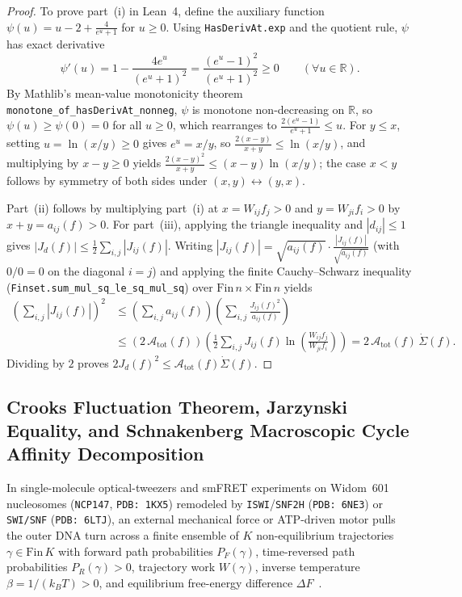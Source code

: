 \documentclass[11pt,a4paper]{article}
\theoremstyle{definition}
\begin{document}
\begin{proof}
To prove part~(i) in Lean~4, define the auxiliary function $\psi(u) = u - 2 + \frac{4}{e^u + 1}$ for $u \ge 0$. Using \texttt{HasDerivAt.exp} and the quotient rule, $\psi$ has exact derivative
\[
  \psi'(u) = 1 - \frac{4 e^u}{(e^u + 1)^2} = \frac{(e^u - 1)^2}{(e^u + 1)^2} \ge 0 \qquad (\forall u \in \mathbb{R}).
\]
By Mathlib's mean-value monotonicity theorem \texttt{monotone\_of\_hasDerivAt\_nonneg}, $\psi$ is monotone non-decreasing on $\mathbb{R}$, so $\psi(u) \ge \psi(0) = 0$ for all $u \ge 0$, which rearranges to $\frac{2(e^u - 1)}{e^u + 1} \le u$. For $y \le x$, setting $u = \ln(x/y) \ge 0$ gives $e^u = x/y$, so $\frac{2(x - y)}{x + y} \le \ln(x/y)$, and multiplying by $x - y \ge 0$ yields $\frac{2(x-y)^2}{x+y} \le (x-y)\ln(x/y)$; the case $x < y$ follows by symmetry of both sides under $(x,y) \leftrightarrow (y,x)$.

Part~(ii) follows by multiplying part~(i) at $x = W_{ij}f_j > 0$ and $y = W_{ji}f_i > 0$ by $x + y = a_{ij}(f) > 0$. For part~(iii), applying the triangle inequality and $|d_{ij}| \le 1$ gives $|J_d(f)| \le \frac{1}{2}\sum_{i,j} |J_{ij}(f)|$. Writing $|J_{ij}(f)| = \sqrt{a_{ij}(f)} \cdot \frac{|J_{ij}(f)|}{\sqrt{a_{ij}(f)}}$ (with $0/0 = 0$ on the diagonal $i = j$) and applying the finite Cauchy--Schwarz inequality (\texttt{Finset.sum\_mul\_sq\_le\_sq\_mul\_sq}) over $\mathrm{Fin}\,n \times \mathrm{Fin}\,n$ yields
\[
\begin{aligned}
  \left(\sum_{i,j} |J_{ij}(f)|\right)^2
  &\le \left(\sum_{i,j} a_{ij}(f)\right)\left(\sum_{i,j} \frac{J_{ij}(f)^2}{a_{ij}(f)}\right) \\
  &\le \left(2\,\mathcal{A}_{\mathrm{tot}}(f)\right)\left(\frac{1}{2}\sum_{i,j} J_{ij}(f)\ln\!\left(\frac{W_{ij}f_j}{W_{ji}f_i}\right)\right) = 2\,\mathcal{A}_{\mathrm{tot}}(f)\,\dot{\Sigma}(f).
\end{aligned}
\]
Dividing by $2$ proves $2 J_d(f)^2 \le \mathcal{A}_{\mathrm{tot}}(f)\dot{\Sigma}(f)$.
\end{proof}

\subsection{Crooks Fluctuation Theorem, Jarzynski Equality, and Schnakenberg Macroscopic Cycle Affinity Decomposition}

In single-molecule optical-tweezers and smFRET experiments on Widom~601 nucleosomes (\texttt{NCP147}, \texttt{PDB: 1KX5}) remodeled by \texttt{ISWI}/\texttt{SNF2H} (\texttt{PDB: 6NE3}) or \texttt{SWI/SNF} (\texttt{PDB: 6LTJ}), an external mechanical force or ATP-driven motor pulls the outer DNA turn across a finite ensemble of $K$ non-equilibrium trajectories $\gamma \in \mathrm{Fin}\,K$ with forward path probabilities $P_F(\gamma)$, time-reversed path probabilities $P_R(\gamma) > 0$, trajectory work $W(\gamma)$, inverse temperature $\beta = 1/(k_B T) > 0$, and equilibrium free-energy difference $\Delta F$~\cite{Jarzynski1997,Crooks1999,Hall2009}.
\end{document}

